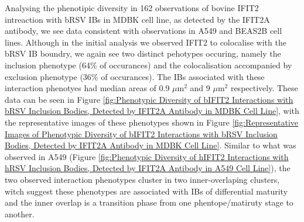 Analysing the phenotipic diversity in 162 observations of bovine IFIT2 intreaction with bRSV IBs in MDBK cell line, as detected by the IFIT2A antibody, we see data consistent with observations in A549 and BEAS2B cell lines. Although in the initial analysis we observed IFIT2 to colocalise with the bRSV IB boundry, we again see two distinct pehotypes occuring, namely the inclusion phenotype (64\% of occurances) and the colocalisation accompanied by exclusion phenotype (36\% of occurances). The IBs associated with these interaction phenotyes had median areas of 0.9 \(\mu \mbox{m}^2\) and 9 \(\mu \mbox{m}^2\) respectively. These data can be seen in Figure \ref{fig:Phenotypic Diversity of bIFIT2 Interactions with bRSV Inclusion Bodies, Detected by IFIT2A Antibody in MDBK Cell Line}, with the representative images of these phenotypes shown in Figure \ref{fig:Representative Images of Phenotypic Diversity of bIFIT2 Interactions with bRSV Inclusion Bodies, Detected by IFIT2A Antibody in MDBK Cell Line}. Similar to what was observed in A549 (Figure \ref{fig:Phenotypic Diversity of hIFIT2 Interactions with hRSV Inclusion Bodies, Detected by IFIT2A Antibody in A549 Cell Line}), the two observed interaction phenotypes cluster in two inner-overlaping clusters, witch suggest these phenotypes are associated with IBs of differential maturity and the inner overlap is a transition phase from one phentope/matiruty stage to another.

